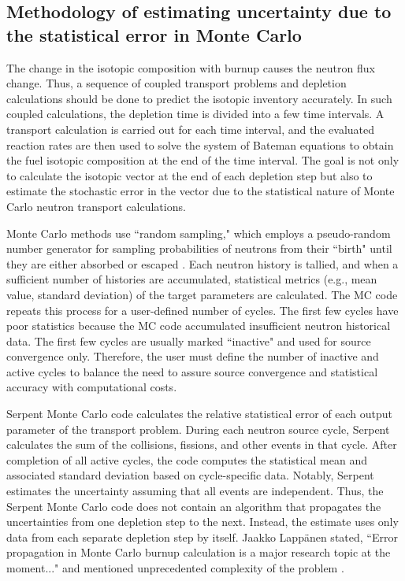 \subsection{Methodology of estimating uncertainty due to the statistical error 
in Monte Carlo}
The change in the isotopic composition with burnup causes the neutron flux 
change. Thus, a sequence of coupled transport problems and depletion 
calculations should be done to predict the isotopic inventory accurately. In 
such coupled calculations, the depletion time is divided into a few time 
intervals. A transport calculation is carried out for each time interval, and 
the evaluated reaction rates are then used to solve the system of Bateman 
equations to obtain the fuel isotopic composition at the end 
of the time interval. The goal is not only to calculate the isotopic vector at 
the end of each depletion step but also to estimate the stochastic error in 
the vector due to the statistical nature of Monte Carlo neutron transport 
calculations.

Monte Carlo methods use ``random sampling," which employs a pseudo-random 
number generator for sampling probabilities of neutrons from their ``birth" 
until they are either absorbed or escaped \cite{brown_fundamentals_2005}. Each 
neutron history is tallied, and when a sufficient number of histories are 
accumulated, statistical metrics (e.g., mean value, standard deviation) of the 
target parameters are calculated. The \gls{MC} code repeats this process for a
user-defined number of cycles. The first few cycles have poor statistics 
because the \gls{MC} code accumulated insufficient neutron historical data. 
The first few cycles are usually marked ``inactive" and used for source 
convergence only. Therefore, the user must define the number of inactive and 
active cycles to balance the need to assure source convergence and 
statistical accuracy with computational costs.

Serpent Monte Carlo code calculates the relative statistical error of each 
output parameter of the transport problem. 
During each neutron source cycle, Serpent calculates the sum of the 
collisions, fissions, and other events in that cycle. After completion of all 
active cycles, the code computes the statistical mean and associated standard 
deviation based on cycle-specific data. Notably, Serpent estimates the 
uncertainty assuming that all events are independent. Thus, the Serpent Monte 
Carlo code does not contain an algorithm that propagates the uncertainties 
from one depletion step to the next. Instead, the estimate uses only data from 
each separate depletion step by itself. Jaakko Lapp\"{a}nen stated, ``Error 
propagation in Monte Carlo burnup calculation is a major research topic at the 
moment..." and mentioned unprecedented complexity of the problem 
\cite{leppanen_statistical_2012}.

